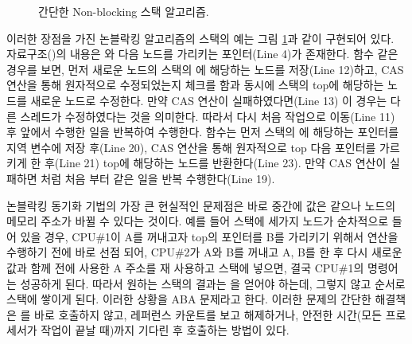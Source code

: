 \begin{figure}[h!]
\begin{center}
\inputminted[linenos,fontsize=\footnotesize,
tabsize=4]{c}{src/lockfree_stack.c}
\end{center}
\caption{간단한 Non-blocking 스택 알고리즘.}
\label{fig:nonblockingstack}
\end{figure}


이러한 장점을 가진 논블락킹 알고리즘의 스택의 예는 그림 \ref{fig:nonblockingstack}과 같이
구현되어 있다.
자료구조()의 내용은 와 다음 노드를 가리키는 포인터(Line 4)가 존재한다.
 함수 같은 경우를 보면, 먼저 새로운 노드의 스택의 에 해당하는 노드를 저장(Line 12)하고, 
CAS 연산을 통해 원자적으로 수정되었는지 체크를 함과 동시에 스택의 top에 해당하는 노드를 새로운 노드로 수정한다.
만약 CAS 연산이 실패하였다면(Line 13) 이 경우는 다른 스레드가 수정하였다는 것을 의미한다.
따라서 다시 처음 작업으로 이동(Line 11) 후 앞에서 수행한 일을 반복하여 수행한다.
 함수는 먼저 스택의 에 해당하는 포인터를 지역 변수에 저장 후(Line 20), CAS 연산을 통해 
원자적으로 top 다음 포인터를 가르키게 한 후(Line 21) top에 해당하는 노드를 반환한다(Line 23). 
만약 CAS 연산이 실패하면  처럼 처음 부터 같은 일을 반복 수행한다(Line 19).

논블락킹 동기화 기법의 가장 큰 현실적인 문제점은 바로 중간에 값은 같으나 노드의 메모리 주소가 
바뀔 수 있다는 것이다. 
예를 들어 스택에 세가지 노드가 순차적으로 들어 있을 경우, 
CPU\#1이 A를 꺼내고자 top의 포인터를 B를 가리키기 위해서  연산을 
수행하기 전에 바로 선점 되어,  
CPU\#2가 A와 B를 꺼내고 A, B를 한 후 다시 새로운 값과 함께 전에 사용한 A 주소를 재 사용하고 
스택에 넣으면, 결국 CPU\#1의  명령어는 성공하게 된다.
따라서 원하는 스택의 결과는 을 얻어야 하는데, 그렇지 않고  순서로 스택에 쌓이게
된다.
이러한 상황을 ABA 문제라고 한다. 
이러한 문제의 간단한 해결책은 를 바로 호출하지 않고, 레퍼런스 카운트를 보고 해제하거나, 
안전한 시간(모든 프로세서가 작업이 끝날 때)까지 기다린 후 호출하는 방법이 있다. 


